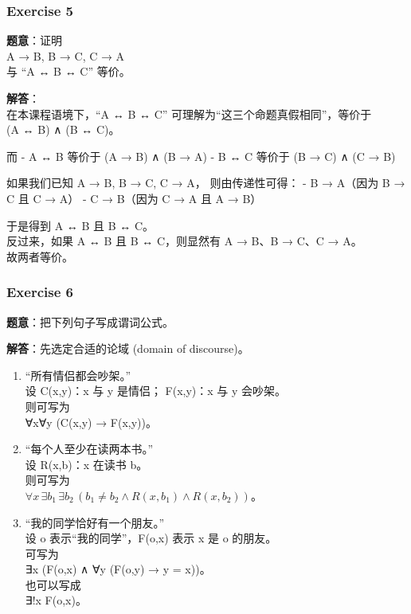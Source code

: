 \documentclass[
  11pt,
]{article}
\begin{document}
\subsubsection{Exercise 5}\label{exercise-5}

\textbf{题意}：证明\\
A → B, B → C, C → A\\
与 ``A ↔ B ↔ C'' 等价。

\textbf{解答}：\\
在本课程语境下，``A ↔ B ↔ C'' 可理解为``这三个命题真假相同''，等价于\\
(A ↔ B) ∧ (B ↔ C)。

而 - A ↔ B 等价于 (A → B) ∧ (B → A) - B ↔ C 等价于 (B → C) ∧ (C → B)

如果我们已知 A → B, B → C, C → A， 则由传递性可得： - B → A（因为 B → C
且 C → A） - C → B（因为 C → A 且 A → B）

于是得到 A ↔ B 且 B ↔ C。\\
反过来，如果 A ↔ B 且 B ↔ C，则显然有 A → B、B → C、C → A。\\
故两者等价。

\subsubsection{Exercise 6}\label{exercise-6}

\textbf{题意}：把下列句子写成谓词公式。

\textbf{解答}：先选定合适的论域 (domain of discourse)。

\begin{enumerate}
\def\labelenumi{\arabic{enumi}.}
\item
  ``所有情侣都会吵架。''\\
  设 C(x,y)：x 与 y 是情侣； F(x,y)：x 与 y 会吵架。\\
  则可写为\\
  ∀x∀y (C(x,y) → F(x,y))。
\item
  ``每个人至少在读两本书。''\\
  设 R(x,b)：x 在读书 b。\\
  则可写为\\
  \(\forall x\, \exists b_1\, \exists b_2\, (b_1 \neq b_2 \land R(x,b_1) \land R(x,b_2))\)。
\item
  ``我的同学恰好有一个朋友。''\\
  设 o 表示``我的同学''，F(o,x) 表示 x 是 o 的朋友。\\
  可写为\\
  ∃x (F(o,x) ∧ ∀y (F(o,y) → y = x))。\\
  也可以写成\\
  ∃!x F(o,x)。
\end{enumerate}
\end{document}
